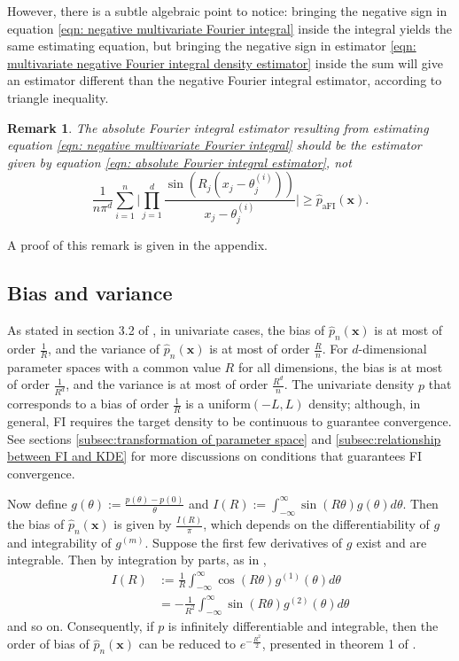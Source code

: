 \documentclass[%
 reprint,
 amsmath,amssymb,
 aps,
]{revtex4-2}
\newtheorem{remark}[theorem]{Remark}
\begin{document}
However, there is a subtle algebraic point to notice: bringing the negative sign in equation \eqref{eqn: negative multivariate Fourier integral} inside the integral yields the same estimating equation, but bringing the negative sign in estimator \eqref{eqn: multivariate negative Fourier integral density estimator} inside the sum will give an estimator different than the negative Fourier integral estimator, according to triangle inequality.
\begin{remark} \label{remark: triangle inequality in aFI}
    The absolute Fourier integral estimator resulting from estimating equation \eqref{eqn: negative multivariate Fourier integral} should be the estimator given by equation \eqref{eqn: absolute Fourier integral estimator}, not
    \begin{equation*}
        \frac{1}{n\pi^d}\sum_{i = 1}^n \bigg|\prod_{j = 1}^d \frac{\sin(R_j(x_j - \theta_j^{(i)}))}{x_j - \theta_j^{(i)}}\bigg| \ge \hat{p}_\text{aFI}(\mathbf{x}).
    \end{equation*}
\end{remark}
A proof of this remark is given in the appendix.

%
\subsection{\label{subsec:FI bias and variance} Bias and variance}
%
As stated in section 3.2 of \cite{rotiroti2022computing}, in univariate cases, the bias of $\hat{p}_n(\mathbf{x})$ is at most of order $\frac{1}{R}$, and the variance of $\hat{p}_n(\mathbf{x})$ is at most of order $\frac{R}{n}$. For $d$-dimensional parameter spaces with a common value $R$ for all dimensions, the bias is at most of order $\frac{1}{R^d}$, and the variance is at most of order $\frac{R^d}{n}$. The univariate density $p$ that corresponds to a bias of order $\frac{1}{R}$ is a uniform$(-L, L)$ density; although, in general, FI requires the target density to be continuous to guarantee convergence. See sections \ref{subsec:transformation of parameter space} and \ref{subsec:relationship between FI and KDE} for more discussions on conditions that guarantees FI convergence.

Now define $\displaystyle g(\theta) := \frac{p(\theta) - p(0)}{\theta}$ and $\displaystyle I(R) := \int_{-\infty}^\infty \sin(R\theta)g(\theta)d\theta$. Then the bias of $\hat{p}_n(\mathbf{x})$ is given by $\displaystyle \frac{I(R)}{\pi}$, which depends on the differentiability of $g$ and integrability of $g^{(m)}$. Suppose the first few derivatives of $g$ exist and are integrable. Then by integration by parts, as in \cite{rotiroti2022computing},
\begin{align*}
    I(R) & := \frac{1}{R} \int_{-\infty}^\infty \cos(R\theta)g^{(1)}(\theta)d\theta \\
    & = -\frac{1}{R^2} \int_{-\infty}^\infty \sin(R\theta)g^{(2)}(\theta)d\theta
\end{align*}
and so on. Consequently, if $p$ is infinitely differentiable and integrable, then the order of bias of $\hat{p}_n(\mathbf{x})$ can be reduced to $e^{-\frac{R^2}{2}}$, presented in theorem 1 of \cite{rotiroti2022computing}.
\end{document}
